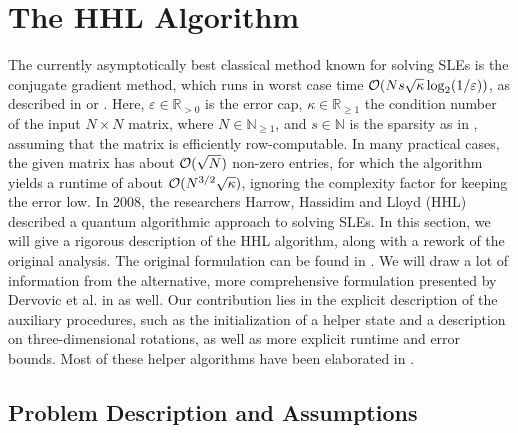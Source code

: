 \section{The HHL Algorithm} \label{the_hhl_algorithm}

The currently asymptotically best classical method known for solving SLEs is the conjugate gradient method, which runs in worst case time \(\operatorname{\mathcal{O}}(N s \sqrt{\kappa} \log_2(1/\varepsilon))\), as described in \cite[complexity analysis on pp. 37-38]{Richard1994} or \cite[pp. 279-306]{Lyche}. Here, \(\varepsilon \in \mathbb{R}_{> 0}\) is the error cap, \(\kappa \in \mathbb{R}_{\geq 1}\) the condition number of the input \(N \times N\) matrix, where \(N \in \mathbb{N}_{\geq 1}\), and \(s \in \mathbb{N}\) is the sparsity as in , assuming that the matrix is efficiently row-computable. In many practical cases, the given matrix has about \(\operatorname{\mathcal{O}}(\sqrt{N})\) non-zero entries, for which the algorithm yields a runtime of about \(\operatorname{\mathcal{O}}(N^{3/2} \sqrt{\kappa})\), ignoring the complexity factor for keeping the error low. In 2008, the researchers Harrow, Hassidim and Lloyd (HHL) described a quantum algorithmic approach to solving SLEs. In this section, we will give a rigorous description of the HHL algorithm, along with a rework of the original analysis. The original formulation can be found in \cite{Harrow2008}. We will draw a lot of information from the alternative, more comprehensive formulation presented by Dervovic et al. in \cite[pp. 28-42]{Dervovic2018} as well. Our contribution lies in the explicit description of the auxiliary procedures, such as the initialization of a helper state and a description on three-dimensional rotations, as well as more explicit runtime and error bounds. Most of these helper algorithms have been elaborated in .

\subsection{Problem Description and Assumptions } \label{hhl_problem_description_and_assumptions}

